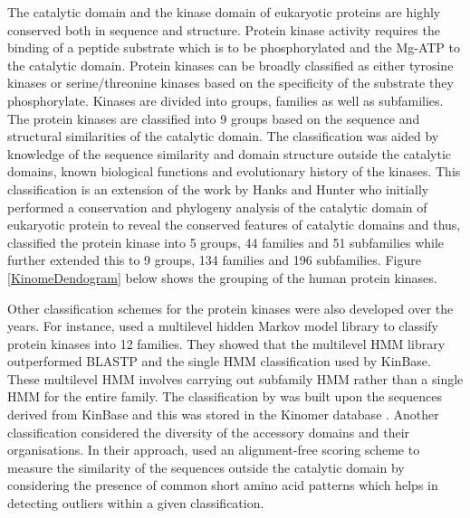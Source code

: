\documentclass[a4paper, 11pt]{article}
\begin{document}
The catalytic domain and the kinase domain of eukaryotic proteins are highly conserved both in sequence and structure. Protein kinase activity requires the binding of a peptide substrate which is to be phosphorylated and the Mg-ATP to the catalytic domain. Protein kinases can be broadly classified as either tyrosine kinases or serine/threonine kinases based on the specificity of the substrate they phosphorylate. Kinases are divided into groups, families as well as subfamilies. The protein kinases are classified into 9 groups based on the sequence and structural similarities of the catalytic domain. The classification was aided by knowledge of the sequence similarity and domain structure outside the catalytic domains, known biological functions and evolutionary history of the kinases. This classification is an extension of the work by Hanks and Hunter who initially performed a conservation and phylogeny analysis of the catalytic domain of eukaryotic protein to reveal the conserved features of catalytic domains and thus, classified the protein kinase into 5 groups, 44 families and 51 subfamilies \cite{hanks1995protein} while \cite{manning2002protein} further extended this to 9 groups, 134 families and 196 subfamilies. Figure \ref{KinomeDendogram} below shows the grouping of the human protein kinases.\par
Other classification schemes for the protein kinases were also developed over the years. For instance, \cite{miranda2007classification} used a multilevel hidden Markov model library to classify protein kinases into 12 families. They showed that the multilevel HMM library outperformed BLASTP and the single HMM classification used by KinBase. These multilevel HMM involves carrying out subfamily HMM rather than a single HMM for the entire family. The classification by \cite{miranda2007classification} was built upon the sequences derived from KinBase\cite{manning2002protein} and this was stored in the Kinomer database \cite{martin2008kinomer}. Another classification considered the diversity of the accessory domains and their organisations. In their approach, \cite{martin2010classification} used an alignment-free scoring scheme to measure the similarity of the sequences outside the catalytic domain by considering the presence of common short amino acid patterns which helps in detecting outliers within a given classification.
\end{document}
